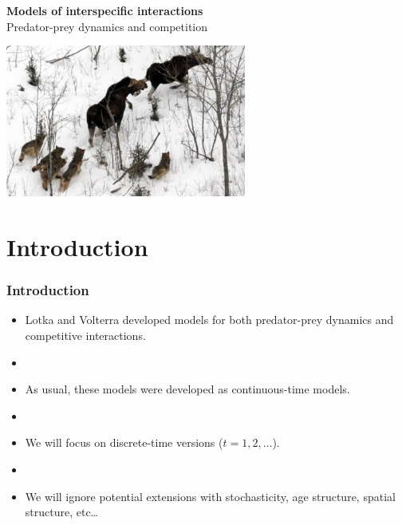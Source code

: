 \documentclass[color=usenames,dvipsnames]{beamer}\usepackage[]{graphicx}\usepackage[]{color}
\begin{document}
\begin{frame}[plain]
  \begin{center}
    {\LARGE {\color{Black} \bf Models of interspecific interactions} \\
      \LARGE {\color{Black} Predator-prey dynamics and
        competition} \par}
    \vspace{0.5cm}
    \vfill
      \includegraphics[height=5cm,keepaspectratio]{figs/isle-royale1} \\
  \end{center}
\end{frame}




\section{Introduction}




\begin{frame}
  \frametitle{Introduction}
  \large
  \begin{itemize}%
    \item<1-> Lotka and Volterra developed models for both predator-prey
      dynamics and competitive interactions.
    \item[]
    \item<2-> As usual, these models were developed as
      continuous-time models.
    \item[]
    \item<3-> We will focus on discrete-time versions ($t = 1, 2, \ldots$).
    \item[]
    \item<4-> We will ignore potential extensions with stochasticity, age
      structure, spatial structure, etc\dots
  \end{itemize}
\end{frame}
\end{document}
